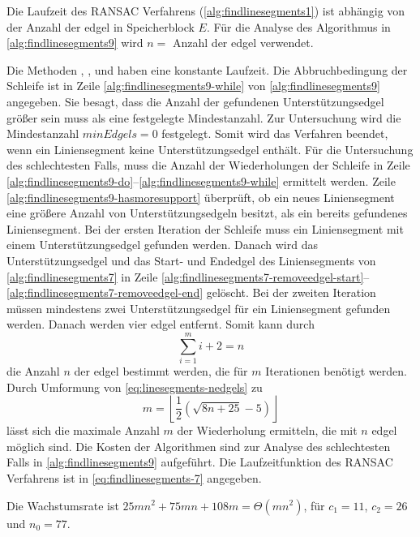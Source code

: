 Die Laufzeit des RANSAC Verfahrens (\autoref{alg:findlinesegments1}) ist abhängig von der Anzahl der \gls{edgel} in
 Speicherblock $E$. Für die Analyse des Algorithmus in \autoref{alg:findlinesegments9} wird $n = $ Anzahl der
 \gls{edgel} verwendet.

Die Methoden , ,  und 
 haben eine konstante Laufzeit. Die Abbruchbedingung der Schleife ist in Zeile \ref{alg:findlinesegments9-while} von
 \autoref{alg:findlinesegments9} angegeben. Sie besagt, dass die Anzahl der gefundenen Unterstützungsedgel größer sein
 muss als eine festgelegte Mindestanzahl. Zur Untersuchung wird die Mindestanzahl $\mathit{minEdgels} = 0$ festgelegt.
 Somit wird das Verfahren beendet, wenn ein Liniensegment keine Unterstützungsedgel enthält. Für die Untersuchung des
 schlechtesten Falls, muss die Anzahl der Wiederholungen der Schleife in Zeile
 \ref{alg:findlinesegments9-do}--\ref{alg:findlinesegments9-while} ermittelt werden. Zeile
 \ref{alg:findlinesegments9-hasmoresupport} überprüft, ob ein neues Liniensegment eine größere Anzahl von
 Unterstützungsedgeln besitzt, als ein bereits gefundenes Liniensegment. Bei der ersten Iteration der Schleife muss
 ein Liniensegment mit einem Unterstützungsedgel gefunden werden. Danach wird das Unterstützungsedgel und das Start-
 und Endedgel des Liniensegments von \autoref{alg:findlinesegments7} in Zeile
 \ref{alg:findlinesegments7-removeedgel-start}--\ref{alg:findlinesegments7-removeedgel-end} gelöscht. Bei der zweiten
 Iteration müssen mindestens zwei Unterstützungsedgel für ein Liniensegment gefunden werden. Danach werden vier
 \gls{edgel} entfernt. Somit kann durch
\begin{equation}
\label{eq:linesegments-nedgels}
\sum_{i=1}^{m} i + 2 = n
\end{equation}
die Anzahl $n$ der \gls{edgel} bestimmt werden, die für $m$ Iterationen benötigt werden. Durch Umformung von \autoref{eq:linesegments-nedgels} zu
\begin{equation}
\label{eq:linesegments-miteration}
m = \left\lfloor\frac{1}{2}(\sqrt{8n+25} - 5)\right\rfloor
\end{equation}
lässt sich die maximale Anzahl $m$ der Wiederholung ermitteln, die mit $n$ \gls{edgel} möglich sind. %
Die Kosten der  Algorithmen sind zur Analyse des schlechtesten Falls in \autoref{alg:findlinesegments9} aufgeführt. Die
 Laufzeitfunktion des RANSAC Verfahrens ist in \autoref{eq:findlinesegments-7} angegeben.

Die Wachstumsrate ist $25mn^2 + 75mn + 108m = \Theta(mn^2)$, für $c_{1} = 11$, $c_{2} = 26$ und $n_{0} = 77$.

